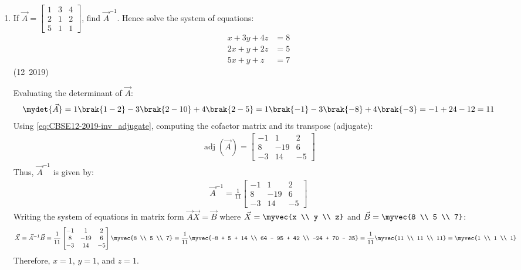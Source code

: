 \begin{enumerate}[label=\thesubsection.\arabic*, ref=\thesubsection.\theenumi]
\item If $\vec{A} = \begin{bmatrix} 1 & 3 & 4 \\ 2 & 1 & 2 \\ 5 & 1 & 1 \end{bmatrix}$, find $\vec{A}^{-1}$. Hence solve the system of equations:
\begin{align}
	x + 3y + 4z &= 8 \\
	2x + y + 2z &= 5 \\
	5x + y + z &= 7
\end{align}
\hfill (12~2019)

\solution
Evaluating the determinant of $\vec{A}$:
\begin{align}
	\mydet{\vec{A}} = 1\brak{1 - 2} - 3\brak{2 - 10} + 4\brak{2 - 5} = 1\brak{-1} - 3\brak{-8} + 4\brak{-3} = -1 + 24 - 12 = 11
\end{align}
Using \eqref{eq:CBSE12-2019-inv_adjugate}, computing the cofactor matrix and its transpose (adjugate):
\begin{align}
	\operatorname{adj}(\vec{A}) = \begin{bmatrix}
		-1 & 1 & 2 \\
		8 & -19 & 6 \\
		-3 & 14 & -5
	\end{bmatrix}
\end{align}
Thus, $\vec{A}^{-1}$ is given by:
\begin{align}
	\vec{A}^{-1} = \frac{1}{11}\begin{bmatrix}
		-1 & 1 & 2 \\
		8 & -19 & 6 \\
		-3 & 14 & -5
	\end{bmatrix}
\end{align}
Writing the system of equations in matrix form $\vec{A}\vec{X} = \vec{B}$ where $\vec{X} = \myvec{x \\ y \\ z}$ and $\vec{B} = \myvec{8 \\ 5 \\ 7}$:
\begin{align}
	\vec{X} = \vec{A}^{-1}\vec{B} = \frac{1}{11}\begin{bmatrix}
		-1 & 1 & 2 \\
		8 & -19 & 6 \\
		-3 & 14 & -5
	\end{bmatrix}\myvec{8 \\ 5 \\ 7} = \frac{1}{11}\myvec{-8 + 5 + 14 \\ 64 - 95 + 42 \\ -24 + 70 - 35} = \frac{1}{11}\myvec{11 \\ 11 \\ 11} = \myvec{1 \\ 1 \\ 1}
\end{align}
Therefore, $x = 1$, $y = 1$, and $z = 1$.



\end{enumerate}
